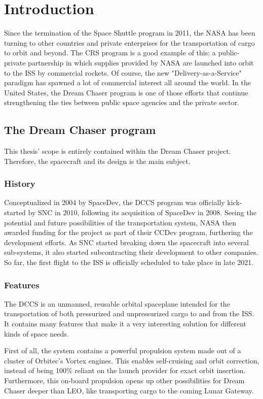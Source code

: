 \setlength{\parindent}{2em}
\chapter{Introduction}\label{cha:intro}
Since the termination of the Space Shuttle program in 2011, the \gls{NASA} has been turning to other countries and private enterprises for the transportation of cargo to orbit and beyond. The \gls{CRS} program is a good example of this: a public-private partnership in which supplies provided by NASA are launched into orbit to the \gls{ISS} by commercial rockets. Of course, the new "Delivery-as-a-Service" paradigm has spawned a lot of commercial interest all around the world. In the United States, the Dream Chaser program is one of those efforts that continue strengthening the ties between public space agencies and the private sector.

\section{The Dream Chaser program}
This thesis' scope is entirely contained within the Dream Chaser project. Therefore, the spacecraft and its design is the main subject. 
\subsection{History}
Conceptualized in 2004 by SpaceDev, the \gls{DCCS} program was officially kick-started by \gls{SNC} in 2010, following its acquisition of SpaceDev in 2008\cite{online:fikes}. Seeing the potential and future possibilities of the transportation system, NASA then awarded funding for the project as part of their \gls{CCDev} program, furthering the development efforts. As \gls{SNC} started breaking down the spacecraft into several sub-systems, it also started subcontracting their development to other companies. So far, the first flight to the \gls{ISS} is officially scheduled to take place in late 2021\cite{online:kanayama}.

\subsection{Features}
The \gls{DCCS} is an unmanned, reusable orbital spaceplane intended for the transportation of both pressurized and unpressurized cargo to and from the \gls{ISS}. It contains many features that make it a very interesting solution for different kinds of space needs. 

First of all, the system contains a powerful propulsion system made out of a cluster of Orbitec's Vortex engines\cite{online:messier}. This enables self-cruising and orbit correction, instead of being 100\% reliant on the launch provider for exact orbit insertion. Furthermore, this on-board propulsion opens up other possibilities for Dream Chaser deeper than \gls{LEO}, like transporting cargo to the coming Lunar Gateway\cite{online:foust}.


